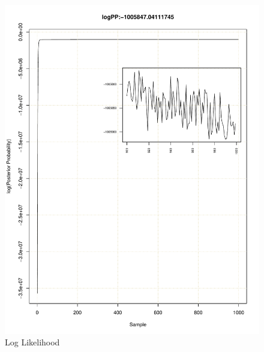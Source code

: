 \documentclass[11pt]{labbook}
\begin{document}
    \begin{figure}
        \centering
        \includegraphics[scale=.65]{FONSE_Plots/2016/December_8/loglike_trace}
        \caption{Log Likelihood}
        \label{fig:DEC8_LIK}
    \end{figure}
\end{document}
